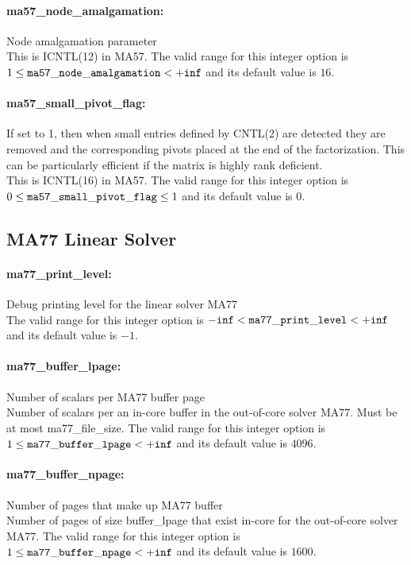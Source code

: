 \paragraph{ma57\_node\_amalgamation:}\label{opt:ma57_node_amalgamation} Node amalgamation parameter \\
 This is ICNTL(12) in MA57. The valid range for this integer option is
$1 \le {\tt ma57\_node\_amalgamation } <  {\tt +inf}$
and its default value is $16$.


\paragraph{ma57\_small\_pivot\_flag:}\label{opt:ma57_small_pivot_flag} If set to 1, then when small entries defined by CNTL(2) are detected they are removed and the corresponding pivots placed at the end of the factorization.  This can be particularly efficient if the matrix is highly rank deficient. \\
 This is ICNTL(16) in MA57. The valid range for this integer option is
$0 \le {\tt ma57\_small\_pivot\_flag } \le 1$
and its default value is $0$.


\subsection{MA77 Linear Solver}

\paragraph{ma77\_print\_level:}\label{opt:ma77_print_level} Debug printing level for the linear solver MA77 \\
 The valid range for this integer option is
${\tt -inf} <  {\tt ma77\_print\_level } <  {\tt +inf}$
and its default value is $-1$.


\paragraph{ma77\_buffer\_lpage:}\label{opt:ma77_buffer_lpage} Number of scalars per MA77 buffer page \\
 Number of scalars per an in-core buffer in the
out-of-core solver MA77. Must be at most
ma77\_file\_size. The valid range for this integer option is
$1 \le {\tt ma77\_buffer\_lpage } <  {\tt +inf}$
and its default value is $4096$.


\paragraph{ma77\_buffer\_npage:}\label{opt:ma77_buffer_npage} Number of pages that make up MA77 buffer \\
 Number of pages of size buffer\_lpage that exist
in-core for the out-of-core solver MA77. The valid range for this integer option is
$1 \le {\tt ma77\_buffer\_npage } <  {\tt +inf}$
and its default value is $1600$.



